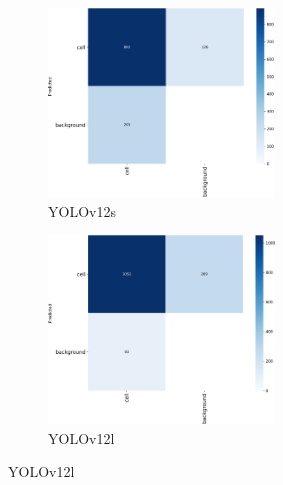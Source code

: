\documentclass[12pt,a4paper,onecolumn,oneside]{report}
\begin{document}
\begin{figure}[H]
  \vspace{0.1cm}
  \begin{subfigure}[b]{0.45\textwidth}
    \centering
    \includegraphics[height=5cm]{figuras/resultados experimentacion/yolov12s/test3/confusion_matrix.png}
    \vspace{-0.3cm}
    \caption{\footnotesize YOLOv12s}
    \label{fig:confusion_yolov12s_test3}
  \end{subfigure}
  \hfill
  \begin{subfigure}[b]{0.45\textwidth}
    \centering
    \includegraphics[height=5cm]{figuras/resultados experimentacion/yolov12l/test3/confusion_matrix.png}
    \vspace{-0.3cm}
    \caption{\footnotesize YOLOv12l}
    \label{fig:confusion_yolov12l_test3}
  \end{subfigure}
  

\end{figure}
\end{document}
